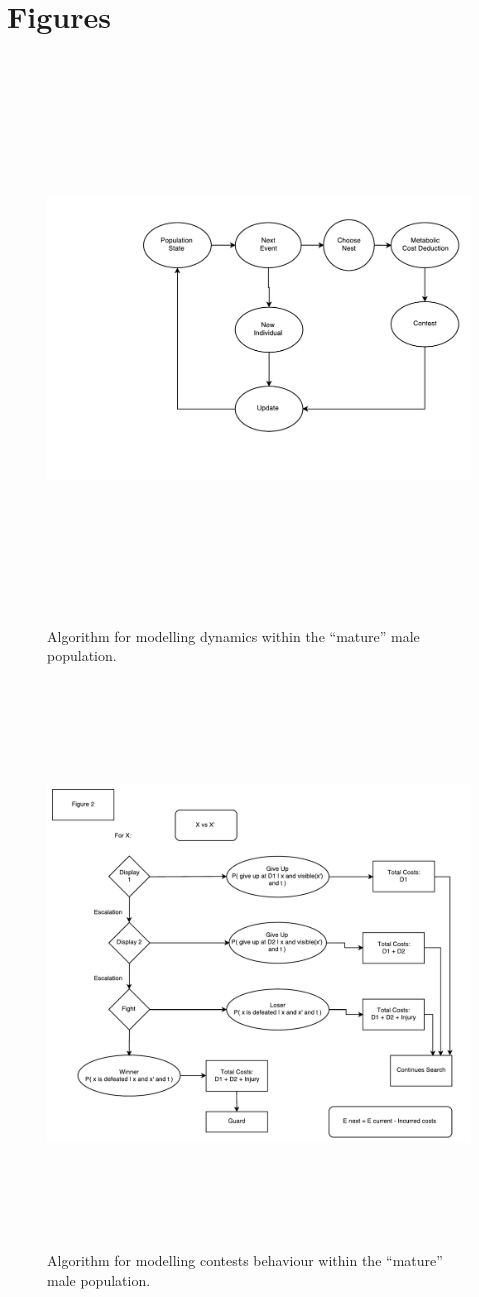 \documentclass[a4paper,11pt]{article}
\begin{document}
\section{Figures}

\begin{figure}[h!]
\centering
\includegraphics[width=15cm,height=15cm,keepaspectratio]{figures/event_algorithm}
\caption{Algorithm for modelling dynamics within the ``mature'' male population.}
\label{fig:events}
\end{figure}
\clearpage

\begin{figure}[h!]
\centering
\includegraphics[width=15cm,height=15cm,keepaspectratio]{figures/contest_algorithm}
\caption{Algorithm for modelling contests behaviour within the ``mature'' male population.}
\label{fig:events}
\end{figure}
\clearpage


\end{document}
